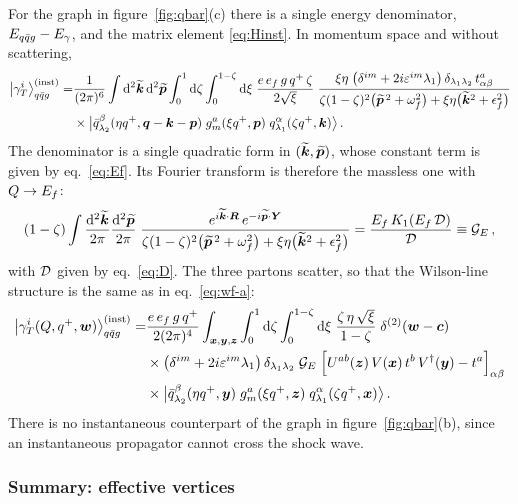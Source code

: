 For the graph in figure~\ref{fig:qbar}(c) there is a single energy denominator, $E_{q\bar q g}-E_\gamma$, and
the matrix element \eqref{eq:Hinst}. In momentum space and without scattering,
\begin{align}
\big|\gamma_T^i\big\rangle^{({\rm inst})}_{q\bar q g}=&\frac{1}{(2\pi)^6}\int{\rm d}^2\widetilde{\bm{k}}\,{\rm d}^2\widetilde{\bm{p}}
\int_0^1{\rm d}\zeta\int_0^{1-\zeta}{\rm d}\xi\;\frac{e\,e_f\,g\,q^+\,\zeta}{2\sqrt\xi}\;
\frac{\xi\eta\;\big(\delta^{im}+2i\varepsilon^{im}\lambda_1\big)\,\delta_{\lambda_1\lambda_2}\,t^a_{\alpha\beta}}
{\zeta(1-\zeta)^2\big(\widetilde{\bm{p}}^{\,2}+\omega_f^2\big)+\xi\eta\big(\widetilde{\bm{k}}^2+\epsilon_f^2\big)}
\nonumber\\
&\times\big|\bar q^\beta_{\lambda_2}(\eta q^+,\bm{q}-\bm{k}-\bm{p})\;g^a_m(\xi q^+,\bm{p})\;q^\alpha_{\lambda_1}(\zeta q^+,\bm{k})\big\rangle\,.
\end{align}
The denominator is a single quadratic form in $(\widetilde{\bm{k}},\widetilde{\bm{p}})$, whose constant term is given by
eq.~\eqref{eq:Ef}. Its Fourier transform is therefore the massless one with $Q\to E_f$:
\begin{equation}
(1-\zeta)\int\frac{{\rm d}^2\widetilde{\bm{k}}}{2\pi}\frac{{\rm d}^2\widetilde{\bm{p}}}{2\pi}\;
\frac{e^{i\widetilde{\bm{k}}\cdot\bm{R}}\,e^{-i\widetilde{\bm{p}}\cdot\bm{Y}}}{\zeta(1-\zeta)^2\big(\widetilde{\bm{p}}^{\,2}+\omega_f^2\big)+\xi\eta\big(\widetilde{\bm{k}}^2+\epsilon_f^2\big)}
=\frac{E_f\,K_1(E_f\,\mathcal{D})}{\mathcal{D}}\equiv\mathcal{G}_E\,,
\label{eq:GE}
\end{equation}
with $\mathcal{D}$ given by eq.~\eqref{eq:D}. The three partons scatter, so that the Wilson-line structure is the
same as in eq.~\eqref{eq:wf-a}:
\begin{align}
\big|\gamma_T^i(Q,q^+,\bm{w})\big\rangle^{({\rm inst})}_{q\bar q g}=&\frac{e\,e_f\,g\,q^+}{2(2\pi)^4}\int_{\bm{x},\bm{y},\bm{z}}
\int_0^1{\rm d}\zeta\int_0^{1-\zeta}{\rm d}\xi\;\frac{\zeta\,\eta\,\sqrt\xi}{1-\zeta}\;\delta^{(2)}(\bm{w}-\bm{c})
\nonumber\\
&\times\big(\delta^{im}+2i\varepsilon^{im}\lambda_1\big)\,\delta_{\lambda_1\lambda_2}\;\mathcal{G}_E\;
\Big[U^{ab}(\bm{z})\,V(\bm{x})\,t^b\,V^\dagger(\bm{y})-t^a\Big]_{\alpha\beta}
\nonumber\\
&\times\big|\bar q^\beta_{\lambda_2}(\eta q^+,\bm{y})\;g^a_m(\xi q^+,\bm{z})\;q^\alpha_{\lambda_1}(\zeta q^+,\bm{x})\big\rangle\,.
\label{eq:wf-inst}
\end{align}
There is no instantaneous counterpart of the graph in figure~\ref{fig:qbar}(b), since an instantaneous
propagator cannot cross the shock wave.

\subsubsection{Summary: effective vertices}
\label{sec:eff}

